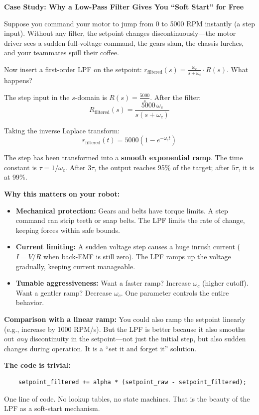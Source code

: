 \vspace{0.5em}
\begin{mdframed}[linewidth=1pt, innertopmargin=10pt, innerbottommargin=10pt]
\textbf{Case Study: Why a Low-Pass Filter Gives You ``Soft Start'' for Free}

\vspace{0.3em}
Suppose you command your motor to jump from 0 to 5000 RPM instantly (a step input). Without any filter, the setpoint changes discontinuously---the motor driver sees a sudden full-voltage command, the gears slam, the chassis lurches, and your teammates spill their coffee.

Now insert a first-order LPF on the setpoint: $r_{\text{filtered}}(s) = \frac{\omega_c}{s + \omega_c} \cdot R(s)$. What happens?

The step input in the $s$-domain is $R(s) = \frac{5000}{s}$. After the filter:
\[
R_{\text{filtered}}(s) = \frac{5000 \, \omega_c}{s(s + \omega_c)}
\]

Taking the inverse Laplace transform:
\[
r_{\text{filtered}}(t) = 5000 \left(1 - e^{-\omega_c t}\right)
\]

The step has been transformed into a \textbf{smooth exponential ramp}. The time constant is $\tau = 1/\omega_c$. After $3\tau$, the output reaches 95\% of the target; after $5\tau$, it is at 99\%.

\textbf{Why this matters on your robot:}
\begin{itemize}[nosep]
    \item \textbf{Mechanical protection:} Gears and belts have torque limits. A step command can strip teeth or snap belts. The LPF limits the rate of change, keeping forces within safe bounds.
    \item \textbf{Current limiting:} A sudden voltage step causes a huge inrush current ($I = V/R$ when back-EMF is still zero). The LPF ramps up the voltage gradually, keeping current manageable.
    \item \textbf{Tunable aggressiveness:} Want a faster ramp? Increase $\omega_c$ (higher cutoff). Want a gentler ramp? Decrease $\omega_c$. One parameter controls the entire behavior.
\end{itemize}

\textbf{Comparison with a linear ramp:} You could also ramp the setpoint linearly (e.g., increase by 1000 RPM/s). But the LPF is better because it also smooths out \textit{any} discontinuity in the setpoint---not just the initial step, but also sudden changes during operation. It is a ``set it and forget it'' solution.

\textbf{The code is trivial:}
\begin{verbatim}
    setpoint_filtered += alpha * (setpoint_raw - setpoint_filtered);
\end{verbatim}

One line of code. No lookup tables, no state machines. That is the beauty of the LPF as a soft-start mechanism.
\end{mdframed}

